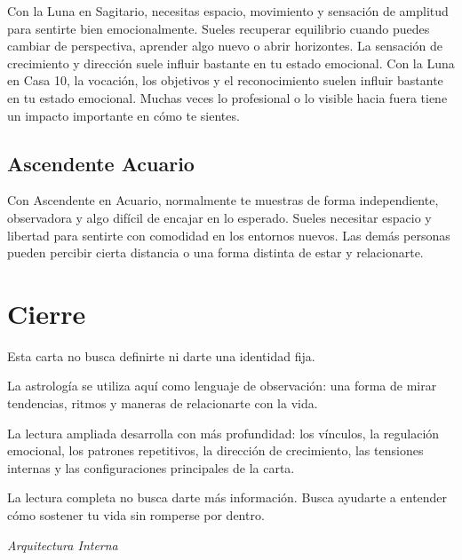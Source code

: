 \documentclass[11pt,a4paper]{article}
\begin{document}
Con la Luna en Sagitario, necesitas espacio, movimiento y sensación de amplitud para sentirte bien emocionalmente. Sueles recuperar equilibrio cuando puedes cambiar de perspectiva, aprender algo nuevo o abrir horizontes. La sensación de crecimiento y dirección suele influir bastante en tu estado emocional. Con la Luna en Casa 10, la vocación, los objetivos y el reconocimiento suelen influir bastante en tu estado emocional. Muchas veces lo profesional o lo visible hacia fuera tiene un impacto importante en cómo te sientes.

\vspace{0.8cm}

\subsection{Ascendente Acuario}

Con Ascendente en Acuario, normalmente te muestras de forma independiente, observadora y algo difícil de encajar en lo esperado. Sueles necesitar espacio y libertad para sentirte con comodidad en los entornos nuevos. Las demás personas pueden percibir cierta distancia o una forma distinta de estar y relacionarte.

\vspace{0.8cm}


\section{Cierre}

Esta carta no busca definirte ni darte una identidad fija.

La astrología se utiliza aquí como lenguaje de observación:
una forma de mirar tendencias, ritmos y maneras de relacionarte con la vida.

La lectura ampliada desarrolla con más profundidad:
los vínculos,
la regulación emocional,
los patrones repetitivos,
la dirección de crecimiento,
las tensiones internas
y las configuraciones principales de la carta.

La lectura completa no busca darte más información.
Busca ayudarte a entender cómo sostener tu vida sin romperse por dentro.

\vspace{1cm}

\begin{center}

{\small\itshape\color{grisai}
Arquitectura Interna
}

\end{center}
\end{document}
